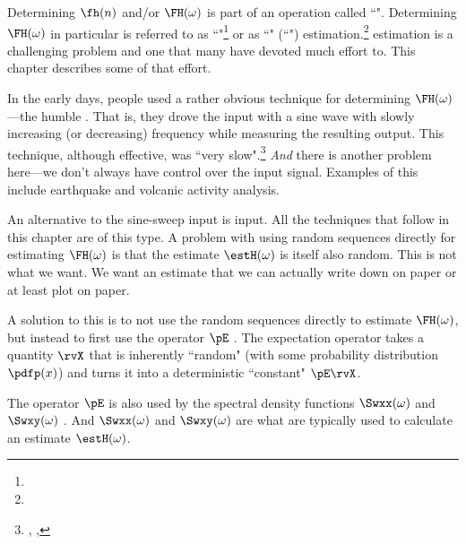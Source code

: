 Determining $\fh(n)$ and/or $\FH(\omega)$ is part of an operation called ``".
Determining $\FH(\omega)$ in particular is referred to as
``"\footnote{}
or as
``" (``") estimation.\footnote{}
 estimation is a challenging problem and one that
many have devoted much effort to.
This chapter describes some of that effort.

In the early days, people used a rather obvious technique for determining $\FH(\omega)$---the humble
. That is, they drove the input with a sine wave with slowly increasing (or decreasing)
frequency while measuring the resulting output.
This technique, although effective, was ``very slow".\footnote{
  ,
  ,
  }
\emph{And} there is another problem here---we don't always have control over the input signal.
Examples of this include earthquake and volcanic activity analysis.

An alternative to the sine-sweep input is  input.
All the techniques that follow in this chapter are of this type.
A problem with using random sequences directly for estimating $\FH(\omega)$ is that the
estimate $\estH(\omega)$ is itself also random.
This is not what we want. We want an estimate that we can actually write down
on paper or at least plot on paper.

A solution to this is to not use the random sequences directly to estimate $\FH(\omega)$,
but instead to first use the  operator $\pE$ .
The expectation operator takes a quantity $\rvX$ that is inherently ``random"
(with some probability distribution $\pdfp(x)$) and
turns it into a deterministic ``constant" $\pE\rvX$.

The operator $\pE$ is also used by the spectral density functions
$\Swxx(\omega)$ and $\Swxy(\omega)$ .
And $\Swxx(\omega)$ and $\Swxy(\omega)$ are what are typically used to calculate
an estimate $\estH(\omega)$.

